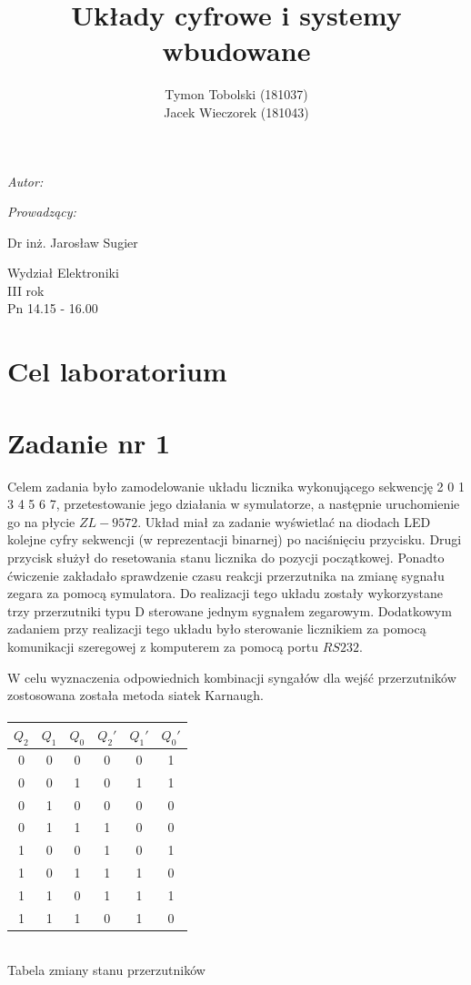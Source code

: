 \documentclass[wide,a4paper,titlepage,12pt] {article}
\title{Układy cyfrowe i systemy wbudowane}
\author{Tymon Tobolski (181037)\\ Jacek Wieczorek (181043)}
\makeatletter
\renewcommand{\maketitle}{
\begin{titlepage}
  \begin{center}
    \vspace*{3cm}
    \LARGE \@title \par
    \vspace{2cm}
    \textit{\small Autor:}\par
    \normalsize \@author\par \normalsize
    \vspace{3cm}
    \textit{\small Prowadzący:}\par
    Dr inż. Jarosław Sugier \par
    \vspace{2cm}
    Wydział Elektroniki\\ III rok\\ Pn 14.15 - 16.00\par
    \vspace{4cm}
    \small \@date
  \end{center}
\end{titlepage}
}
\makeatother
\begin{document}
\maketitle
  \section{Cel laboratorium}

  \section{Zadanie nr 1}
  Celem zadania było zamodelowanie układu licznika wykonującego sekwencję 2 0 1 3 4 5 6 7, przetestowanie jego działania w symulatorze, a następnie uruchomienie go na płycie $ZL-9572$. Układ miał za zadanie wyświetlać na diodach LED kolejne cyfry sekwencji (w reprezentacji binarnej) po naciśnięciu przycisku. Drugi przycisk służył do resetowania stanu licznika do pozycji początkowej. Ponadto ćwiczenie zakładało sprawdzenie czasu reakcji przerzutnika na zmianę sygnału zegara za pomocą symulatora. Do realizacji tego układu zostały wykorzystane trzy przerzutniki typu D sterowane jednym sygnałem zegarowym. Dodatkowym zadaniem przy realizacji tego układu było sterowanie licznikiem za pomocą komunikacji szeregowej z komputerem za pomocą portu $RS232$.

  W celu wyznaczenia odpowiednich kombinacji syngałów dla wejść przerzutników zostosowana została metoda siatek Karnaugh.

  \paragraph{}

	  \begin{center}

	  \begin{tabular}{|c|c|c||c|c|c|}
			\hline
			$Q_{2}$ & $Q_{1}$ & $Q_{0}$ & $Q_{2}'$ & $Q_{1}'$ & $Q_{0}'$ \\
			\hline
      0 & 0 & 0 & 0 & 0 & 1 \\
      0 & 0 & 1 & 0 & 1 & 1 \\
      0 & 1 & 0 & 0 & 0 & 0 \\
      0 & 1 & 1 & 1 & 0 & 0 \\
      1 & 0 & 0 & 1 & 0 & 1 \\
      1 & 0 & 1 & 1 & 1 & 0 \\
      1 & 1 & 0 & 1 & 1 & 1 \\
      1 & 1 & 1 & 0 & 1 & 0 \\
      \hline
	  \end{tabular}
	 \\ Tabela zmiany stanu przerzutników
	  \end{center}
\end{document}
